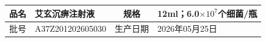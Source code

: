 \documentclass[UTF8,10pt,a4paper,fontset=fandol]{ctexart}
\newcommand{\fieldvalue}[1]{#1}
\begin{document}
\newpage


\begin{center}
\begin{tabular}{|c|l|c|l|}
\hline
品名 &
\fieldvalue{艾玄沉痹注射液} &
规格 &
\fieldvalue{12ml；6.0$\times 10^{7}$个细菌/瓶} \\
\hline
批号 &
\fieldvalue{A37Z201202605030} &
生产日期 &
\fieldvalue{2026年05月25日} \\
\hline
\end{tabular}

\vspace{0pt}


\end{center}
\end{document}
